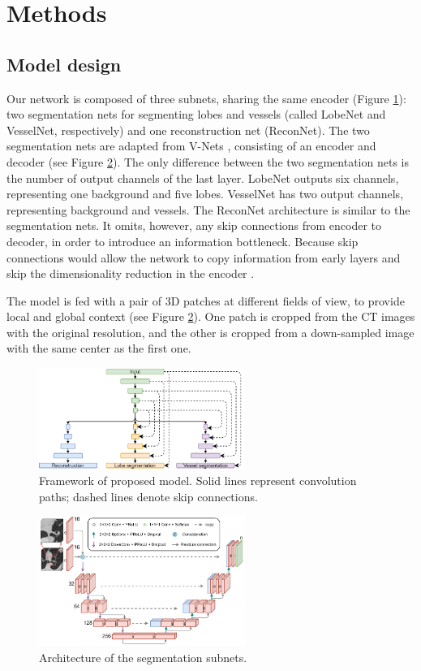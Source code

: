 \section{Methods}
\subsection{Model design}
Our network is composed of three subnets, sharing the same encoder (Figure \ref{fig:chap2_structure}): two segmentation nets for segmenting lobes and vessels (called LobeNet and VesselNet, respectively) and one reconstruction net (ReconNet). The two segmentation nets are adapted from V-Nets \cite{milletari2016v}, consisting of an encoder and decoder (see Figure \ref{fig:chap2_unet}). The only difference between the two segmentation nets is the number of output channels of the last layer. LobeNet outputs six channels, representing one background and five lobes. VesselNet has two output channels, representing background and vessels. The ReconNet architecture is similar to the segmentation nets. It omits, however, any skip connections from encoder to decoder, in order to introduce an information bottleneck. Because skip connections would allow the network to copy information from early layers and skip the dimensionality reduction in the encoder \cite{chen2019multi}.

The model is fed with a pair of 3D patches at different fields of view, to provide local and global context (see Figure \ref{fig:chap2_unet}). One patch is cropped from the CT images with the original resolution, and the other is cropped from a down-sampled image with the same center as the first one.

\begin{figure}[tb]
    \centering
    \includegraphics[width=0.6\textwidth]{structure.png}
    \caption{Framework of proposed model. Solid lines represent convolution paths; dashed lines denote skip connections.}
    \label{fig:chap2_structure}
\end{figure}

\begin{figure}[tb]
    \centering
    \includegraphics[width=0.6\textwidth]{unet.png}
    \caption{Architecture of the segmentation subnets.}
    \label{fig:chap2_unet}
\end{figure}


